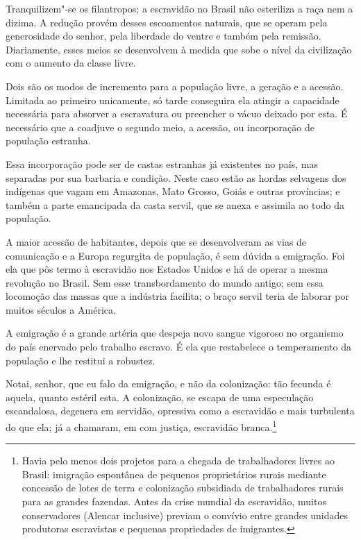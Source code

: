  Tranquilizem"-se os filantropos; a escravidão no Brasil não esteriliza \label{filantropo}
a raça nem a dizima. A redução provém desses escoamentos naturais, que
se operam pela generosidade do senhor, pela liberdade do ventre e
também pela remissão. Diariamente, esses meios se desenvolvem à medida
que sobe o nível da civilização com o aumento da classe livre.

 Dois são os modos de incremento para a população livre, a geração e a
acessão. Limitada ao primeiro unicamente, só tarde conseguira ela
atingir a capacidade necessária para absorver a escravatura ou
preencher o vácuo deixado por esta. É necessário que a coadjuve o
segundo meio, a acessão, ou incorporação de população estranha.

 Essa incorporação pode ser de castas estranhas já existentes no país,
mas separadas por sua barbaria e condição. Neste caso estão as hordas
selvagens dos indígenas que vagam em Amazonas, Mato Grosso, Goiás e
outras províncias; e também a parte emancipada da casta servil, que se
anexa e assimila ao todo da população.

 A maior acessão de habitantes, depois que se desenvolveram as vias de
comunicação e a Europa regurgita de população, é sem dúvida a
emigração. Foi ela que pôs termo à escravidão nos Estados Unidos e há
de operar a mesma revolução no Brasil. Sem esse transbordamento do
mundo antigo; sem essa locomoção das massas que a indústria facilita; o
braço servil teria de laborar por muitos séculos a América.

 A emigração é a grande artéria que despeja novo sangue vigoroso no
organismo do país enervado pelo trabalho escravo. É ela que restabelece
o temperamento da população e lhe restitui a robustez. 

 Notai, senhor, que eu falo da emigração, e não da \mbox{colonização}: tão
fecunda é aquela, quanto estéril esta. A colonização, se escapa de uma
especulação escandalosa, degenera em servidão, opressiva como a
escravidão e mais turbulenta do que ela; já a chamaram, em com justiça,
escravidão branca.\footnote{ Havia pelo menos dois projetos para a chegada de trabalhadores 
livres ao Brasil: imigração espontânea de pequenos proprietários rurais mediante concessão 
de lotes de terra e colonização subsidiada de trabalhadores rurais para as grandes fazendas. 
Antes da crise mundial da escravidão, muitos conservadores (Alencar inclusive) previam o 
convívio entre grandes unidades produtoras escravistas e pequenas propriedades de imigrantes.}

